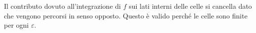 \documentclass[preview]{standalone}
\begin{document}
\begin{center}
Il contributo dovuto all'integrazione di $f$ sui lati interni delle celle si cancella dato che vengono percorsi in senso opposto. Questo è valido perché le celle sono finite per ogni $\varepsilon$.
\end{center}
\end{document}
